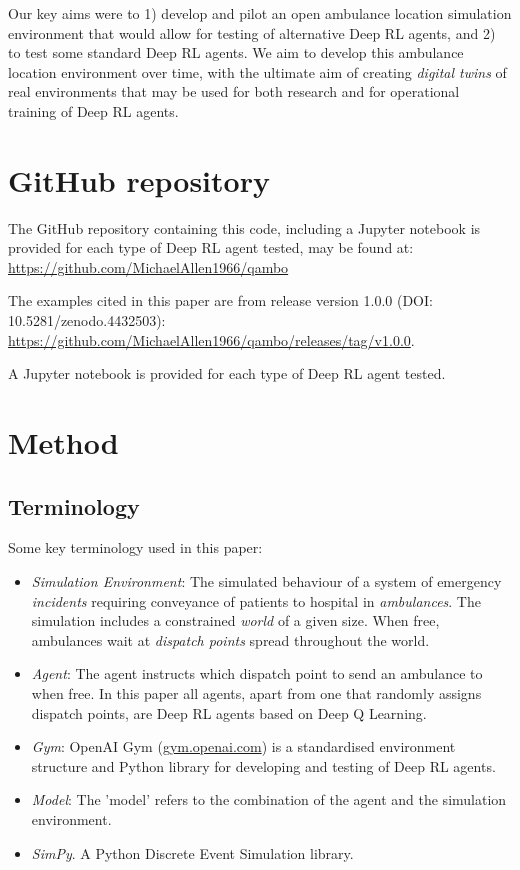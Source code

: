 \documentclass{article}
\begin{document}
Our key aims were to 1) develop and pilot an open ambulance location simulation environment that would allow for testing of alternative Deep RL agents, and 2) to test some standard Deep RL agents. We aim to develop this ambulance location environment over time, with the ultimate aim of creating \emph{digital twins} of real environments that may be used for both research and for operational training of Deep RL agents.

\section{GitHub repository}

The GitHub repository containing this code, including a Jupyter notebook is provided for each type of Deep RL agent tested, may be found at: \url{https://github.com/MichaelAllen1966/qambo}

The examples cited in this paper are from release version 1.0.0 (DOI: 10.5281/zenodo.4432503): 
\url{https://github.com/MichaelAllen1966/qambo/releases/tag/v1.0.0}.

A Jupyter notebook is provided for each type of Deep RL agent tested.

\section{Method}

\subsection{Terminology}

Some key terminology used in this paper:

\begin{itemize}

    \item \emph{Simulation Environment}: The simulated behaviour of a system of emergency \emph{incidents} requiring conveyance of patients to {hospital} in \emph{ambulances}. The simulation includes a constrained \emph{world} of a given size. When free, ambulances wait at \emph{dispatch points} spread throughout the world.

    \item \emph{Agent}: The agent instructs which dispatch point to send an ambulance to when free. In this paper all agents, apart from one that randomly assigns dispatch points, are Deep RL agents based on Deep Q Learning.

    \item \emph{Gym}: OpenAI Gym (\url{gym.openai.com}) is a standardised environment structure and Python library for developing and testing of Deep RL agents.
        
    \item \emph{Model}: The 'model' refers to the combination of the agent and the simulation environment.

    \item \emph{SimPy}. A Python Discrete Event Simulation library.

    
\end{itemize}
\end{document}
